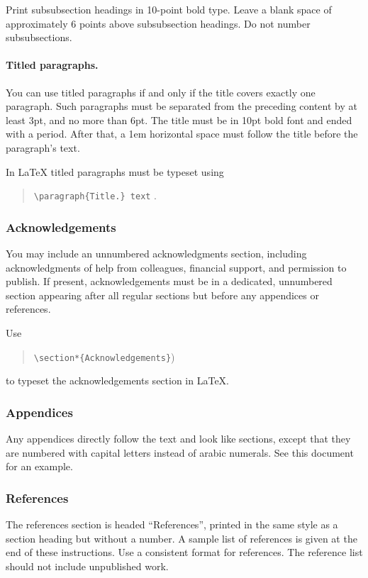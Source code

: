 \documentclass{article}
\begin{document}
Print subsubsection headings in 10-point bold type. Leave a blank
space of approximately 6 points above subsubsection headings. Do not
number subsubsections.

\paragraph{Titled paragraphs.} You can use titled paragraphs if and 
only if the title covers exactly one paragraph. Such paragraphs must be
separated from the preceding content by at least 3pt, and no more than
6pt. The title must be in 10pt bold font and ended with a period. 
After that, a 1em horizontal space must follow the title before 
the paragraph's text.

In \LaTeX{} titled paragraphs must be typeset using
\begin{quote}
{\tt \textbackslash{}paragraph\{Title.\} text} .
\end{quote}

\subsubsection{Acknowledgements}

You may include an unnumbered acknowledgments section, including
acknowledgments of help from colleagues, financial support, and
permission to publish. If present, acknowledgements must be in a dedicated,
unnumbered section appearing after all regular sections but before any
appendices or references.

Use 
\begin{quote}
    {\tt \textbackslash{}section*\{Acknowledgements\}})
\end{quote}
to typeset the acknowledgements section in \LaTeX{}.

\subsubsection{Appendices}

Any appendices directly follow the text and look like sections, except
that they are numbered with capital letters instead of arabic
numerals. See this document for an example.

\subsubsection{References}

The references section is headed ``References'', printed in the same
style as a section heading but without a number. A sample list of
references is given at the end of these instructions. Use a consistent
format for references. The reference list should not include unpublished
work.
\end{document}
